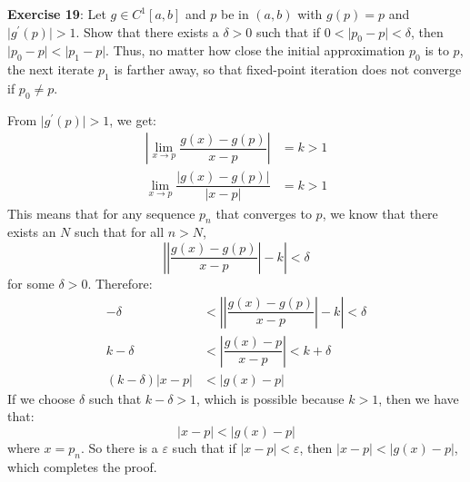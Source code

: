 \documentclass{article}
\begin{document}
\textbf{Exercise 19}: Let $g \in C^{1}[a, b]$ and $p$ be in $(a, b)$ with $g(p) = p$ and $\lvert g^{\prime}(p) \rvert > 1$. Show that there exists a $\delta > 0$ such that if $0 < \lvert p_{0} - p \rvert < \delta$, then $\lvert p_{0} - p\rvert < \lvert p_{1} - p \rvert$. Thus, no matter how close the initial approximation $p_{0}$ is to $p$, the next iterate $p_{1}$ is farther away, so that fixed-point iteration does not converge if $p_{0} \neq p$.
    \begin{answer}
        From $\lvert g^{\prime}(p) \rvert > 1$, we get:
            \begin{align*}
                \left\lvert \lim\limits_{x \to p} \dfrac{g(x) - g(p)}{x - p} \right\rvert    &= k > 1                                         \\
                \lim\limits_{x \to p} \dfrac{\lvert g(x) - g(p) \rvert}{\lvert x - p \rvert} & = k > 1                                        
            \end{align*}
        This means that for any sequence $p_{n}$ that converges to $p$, we know that there exists an $N$ such that for all $n > N$, 
            \begin{equation*}
                \left\lvert \left\lvert \dfrac{g(x) - g(p)}{x - p} \right\rvert - k \right\rvert < \delta
            \end{equation*}
        for some $\delta > 0$. Therefore:
            \begin{align*}
                -\delta                         &< \left\lvert \left\lvert \dfrac{g(x) - g(p)}{x - p} \right\rvert - k \right\rvert < \delta \\
                k - \delta                      &< \left\lvert \dfrac{g(x) - p}{x - p} \right\rvert < k + \delta                             \\
                (k - \delta)\lvert x - p \rvert &< \lvert g(x) - p \rvert                                                                      
            \end{align*}
        If we choose $\delta$ such that $k - \delta > 1$, which is possible because $k > 1$, then we have that:
            \begin{equation*}
                \lvert x - p \rvert < \lvert g(x) - p \rvert
            \end{equation*}
        where $x = p_{n}$. So there is a $\varepsilon$ such that if $\lvert x - p \rvert < \varepsilon$, then $\lvert x - p \rvert < \lvert g(x) - p \rvert$, which completes the proof.
    \end{answer}
\end{document}
